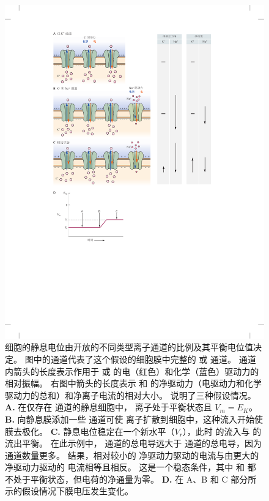 \begin{figure}[htbp]
	\centering
	\includegraphics[width=0.9\linewidth]{chap09/fig_9_4}
	\caption{细胞的静息电位由开放的不同类型离子通道的比例及其平衡电位值决定。
		图中的通道代表了这个假设的细胞膜中完整的  或  通道。
		通道内箭头的长度表示作用于  或  的电（红色）和化学（蓝色）驱动力的相对振幅。
		右图中箭头的长度表示  和  的净驱动力（电驱动力和化学驱动力的总和）和净离子电流的相对大小。
		说明了三种假设情况。
		\textbf{A.} 在仅存在  通道的静息细胞中， 离子处于平衡状态且 $V_m = E_K$。
		\textbf{B.} 向静息膜添加一些  通道可使  离子扩散到细胞中，这种流入开始使膜去极化。
		\textbf{C.} 静息电位稳定在一个新水平（$V_r$），此时  的流入与  的流出平衡。
		在此示例中， 通道的总电导远大于  通道的总电导，因为  通道数量更多。
		结果，相对较小的  净驱动力驱动的电流与由更大的  净驱动力驱动的  电流相等且相反。
		这是一个稳态条件，其中  和  都不处于平衡状态，但电荷的净通量为零。
		\textbf{D.} 在 A、B 和 C 部分所示的假设情况下膜电压发生变化。}
	\label{fig:9_4}
\end{figure}


